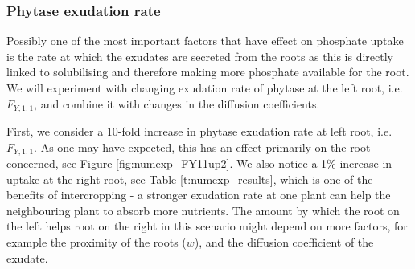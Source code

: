 \documentclass[11pt]{article}
\numberwithin{equation}{section}
\begin{document}
\subsubsection{Phytase exudation rate}
\label{sec:numexp_F11}

Possibly one of the most important factors that have effect on phosphate uptake is the rate at which the exudates are secreted from the roots as this is directly linked to solubilising  and therefore making more phosphate available for the root. We will experiment with changing exudation rate of phytase at the left root, i.e. $F_{Y,1,1}$, and combine it with changes in the diffusion coefficients.

First, we consider a 10-fold increase in phytase exudation rate at left root, i.e. $F_{Y,1,1}$. As one may have expected, this has an effect primarily on the root concerned, see Figure \ref{fig:numexp_FY11up2}. We also notice a 1\% increase in uptake at the right root, see Table \ref{t:numexp_results}, which is one of the benefits of intercropping - a stronger exudation rate at one plant can help the neighbouring plant to absorb more nutrients. The amount by which the root on the left helps root on the right in this scenario might depend on more factors, for example the proximity of the roots ($w$), and the diffusion coefficient of the exudate. 
\end{document}
